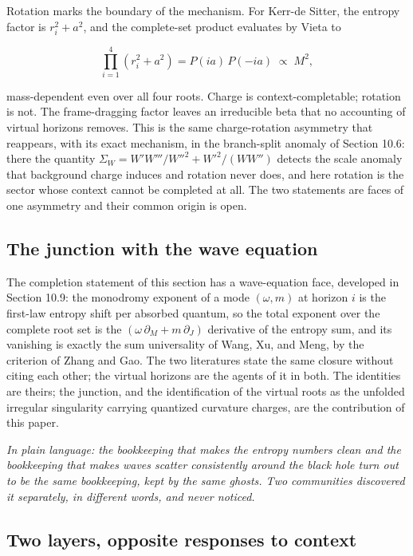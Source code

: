 \documentclass[11pt]{article}
\begin{document}
Rotation marks the boundary of the mechanism. For Kerr-de Sitter, the entropy factor is $r_i^2 + a^2$, and the complete-set product evaluates by Vieta to


\begin{equation*}
\prod_{i=1}^{4} (r_i^2 + a^2) = P(ia)\,P(-ia) \;\propto\; M^2, \tag{9.4}
\end{equation*}


mass-dependent even over all four roots. Charge is context-completable; rotation is not. The frame-dragging factor leaves an irreducible beta that no accounting of virtual horizons removes. This is the same charge-rotation asymmetry that reappears, with its exact mechanism, in the branch-split anomaly of Section 10.6: there the quantity $\Sigma_W = W'W'''/W''^2 + W'^2/(WW'')$ detects the scale anomaly that background charge induces and rotation never does, and here rotation is the sector whose context cannot be completed at all. The two statements are faces of one asymmetry and their common origin is open.

\subsection{The junction with the wave equation}

The completion statement of this section has a wave-equation face, developed in Section 10.9: the monodromy exponent of a mode $(\omega, m)$ at horizon $i$ is the first-law entropy shift per absorbed quantum, so the total exponent over the complete root set is the $(\omega\,\partial_M + m\,\partial_J)$ derivative of the entropy sum, and its vanishing is exactly the sum universality of Wang, Xu, and Meng, by the criterion of Zhang and Gao. The two literatures state the same closure without citing each other; the virtual horizons are the agents of it in both. The identities are theirs; the junction, and the identification of the virtual roots as the unfolded irregular singularity carrying quantized curvature charges, are the contribution of this paper.

\emph{In plain language: the bookkeeping that makes the entropy numbers clean and the bookkeeping that makes waves scatter consistently around the black hole turn out to be the same bookkeeping, kept by the same ghosts. Two communities discovered it separately, in different words, and never noticed.}

\subsection{Two layers, opposite responses to context}
\end{document}

